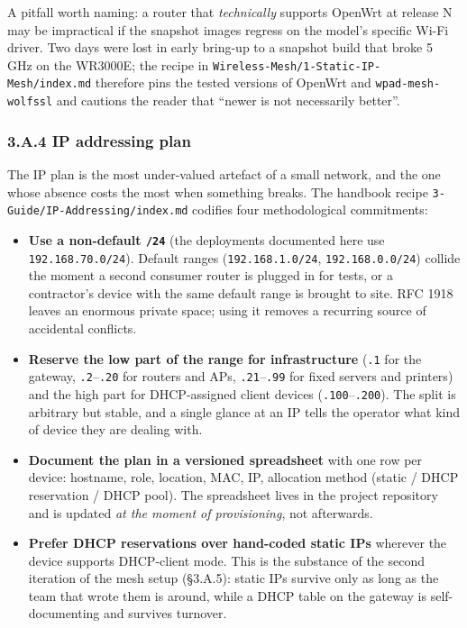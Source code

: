 A pitfall worth naming: a router that \emph{technically} supports
OpenWrt at release N may be impractical if the snapshot images regress
on the model's specific Wi-Fi driver. Two days were lost in early
bring-up to a snapshot build that broke 5 GHz on the WR3000E; the recipe
in \texttt{Wireless-Mesh/1-Static-IP-Mesh/index.md} therefore pins the
tested versions of OpenWrt and \texttt{wpad-mesh-wolfssl} and cautions
the reader that ``newer is not necessarily better''.

\hypertarget{a.4-ip-addressing-plan}{%
\subsubsection{3.A.4 IP addressing plan}\label{a.4-ip-addressing-plan}}

The IP plan is the most under-valued artefact of a small network, and
the one whose absence costs the most when something breaks. The handbook
recipe \texttt{3-Guide/IP-Addressing/index.md} codifies four
methodological commitments:

\begin{itemize}
\tightlist
\item
  \textbf{Use a non-default \texttt{/24}} (the deployments documented
  here use \texttt{192.168.70.0/24}). Default ranges
  (\texttt{192.168.1.0/24}, \texttt{192.168.0.0/24}) collide the moment
  a second consumer router is plugged in for tests, or a contractor's
  device with the same default range is brought to site. RFC 1918 leaves
  an enormous private space; using it removes a recurring source of
  accidental conflicts.
\item
  \textbf{Reserve the low part of the range for infrastructure}
  (\texttt{.1} for the gateway, \texttt{.2}--\texttt{.20} for routers
  and APs, \texttt{.21}--\texttt{.99} for fixed servers and printers)
  and the high part for DHCP-assigned client devices
  (\texttt{.100}--\texttt{.200}). The split is arbitrary but stable, and
  a single glance at an IP tells the operator what kind of device they
  are dealing with.
\item
  \textbf{Document the plan in a versioned spreadsheet} with one row per
  device: hostname, role, location, MAC, IP, allocation method (static /
  DHCP reservation / DHCP pool). The spreadsheet lives in the project
  repository and is updated \emph{at the moment of provisioning}, not
  afterwards.
\item
  \textbf{Prefer DHCP reservations over hand-coded static IPs} wherever
  the device supports DHCP-client mode. This is the substance of the
  second iteration of the mesh setup (§3.A.5): static IPs survive only
  as long as the team that wrote them is around, while a DHCP table on
  the gateway is self-documenting and survives turnover.
\end{itemize}

